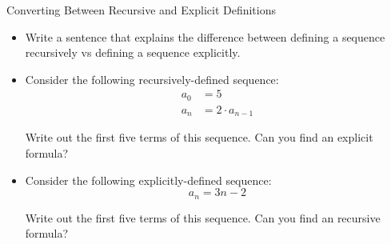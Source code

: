 \begin{exercise}{Converting Between Recursive and Explicit Definitions \Coffeecup \Coffeecup}
\begin{itemize}

\item Write a sentence that explains the difference between defining a sequence recursively vs defining a sequence explicitly.


\item  Consider the following recursively-defined sequence:
\begin{align*}
 a_0&=5 \\ a_{n}&=2\cdot a_{n-1}
\end{align*}


Write out the first five terms of this sequence.  Can you find an explicit formula?


\item  Consider the following explicitly-defined sequence: 
$$ a_{n}=3n-2$$

Write out the first five terms of this sequence.  Can you find an recursive formula?


\end{itemize}
\end{exercise}
